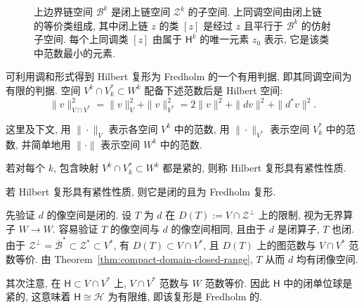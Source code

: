 \begin{figure}[htbp]\centering

\caption{{上边界链空间 $\mathcal B^k$ 是闭上链空间 $\mathcal Z^k$ 的子空间. 上同调空间由闭上链的等价类组成, 其中闭上链 $z$ 的类 $[z]$ 是经过 $z$ 且平行于 $\mathcal B^k$ 的仿射子空间. 每个上同调类 $[z]$ 由属于 $\mathsf H^k$ 的唯一元素 $z_0$ 表示, 它是该类中范数最小的元素.}}\label{fig:cohomology-harmonic-representatives}
\end{figure}

{可利用调和形式得到 Hilbert 复形为 Fredholm 的一个有用判据, 即其同调空间为有限的判据. 空间 $V^k\cap V_k^*\subset W^k$ 配备下述范数后是 Hilbert 空间:}
\[
\|v\|_{V\cap V^*}^2=\|v\|_V^2+\|v\|_{V^*}^2=2\|v\|^2+\|dv\|^2+\|d^*v\|^2.
\]

{这里及下文, 用 $\|\cdot\|_V$ 表示各空间 $V^k$ 中的范数, 用 $\|\cdot\|_{V^*}$ 表示空间 $V_k^*$ 中的范数, 并简单地用 $\|\cdot\|$ 表示空间 $W^k$ 中的范数.}


\begin{Definition}\label{def:hilbert-complex-compactness-property}
{若对每个 $k$, 包含映射 $V^k\cap V_k^*\subset W^k$ 都是紧的, 则称 Hilbert 复形具有紧性性质.}
\end{Definition}


\begin{Theorem}\label{thm:compactness-implies-fredholm}
{若 Hilbert 复形具有紧性性质, 则它是闭的且为 Fredholm 复形.}
\end{Theorem}

\begin{Proof}
{先验证 $d$ 的像空间是闭的. 设 $T$ 为 $d$ 在 $D(T):=V\cap\mathcal Z^\perp$ 上的限制, 视为无界算子 $W\to W$. 容易验证 $T$ 的像空间与 $d$ 的像空间相同, 且由于 $d$ 是闭算子, $T$ 也闭. 由于 $\mathcal Z^\perp=\overline{\mathcal B}^*\subset\mathcal Z^*\subset V^*$, 有 $D(T)\subset V\cap V^*$, 且 $D(T)$ 上的图范数与 $V\cap V^*$ 范数等价. 由 Theorem~\ref{thm:compact-domain-closed-range}, $T$ 从而 $d$ 均有闭像空间.}

{其次注意, 在 $\mathsf H\subset V\cap V^*$ 上, $V\cap V^*$ 范数与 $W$ 范数等价. 因此 $\mathsf H$ 中的闭单位球是紧的, 这意味着 $\mathsf H\cong\mathcal H$ 为有限维, 即该复形是 Fredholm 的.}
\end{Proof}

